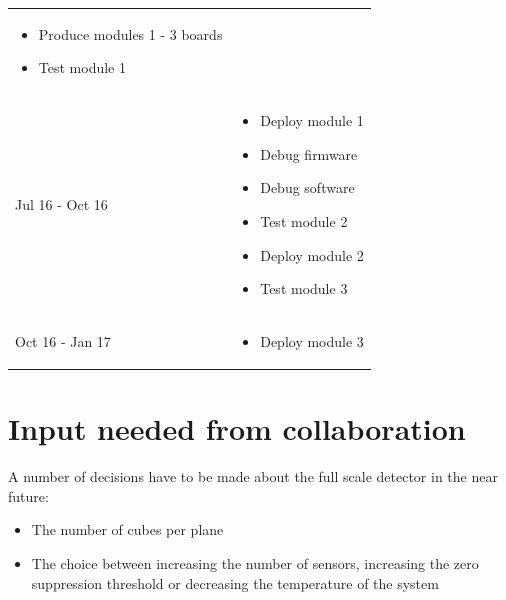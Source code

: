 \documentclass[a4paper]{article}
\begin{document}
\begin{table}[htp]
\begin{center}
\begin{tabular}{p{}p{}}
            \begin{itemize}
                \item Produce modules 1 - 3 boards
                \item Test module 1
            \end{itemize}
            \\
            Jul 16 - Oct 16 & 
            \begin{itemize}
                \item Deploy module 1
                \item Debug firmware
                \item Debug software
                \item Test module 2
                \item Deploy module 2
                \item Test module 3
            \end{itemize}
            \\
            Oct 16 - Jan 17 & 
            \begin{itemize}
                \item Deploy module 3
            \end{itemize}
            \\
            \hline
            \hline
        \end{tabular}
    \end{center}
\end{table}


\section{Input needed from collaboration}

A number of decisions have to be made about the full scale detector in the near future:
\begin{itemize}
    \item The number of cubes per plane
    \item The choice between increasing the number of sensors, increasing the zero suppression threshold or decreasing the temperature of the system
\end{itemize}
\end{document}
